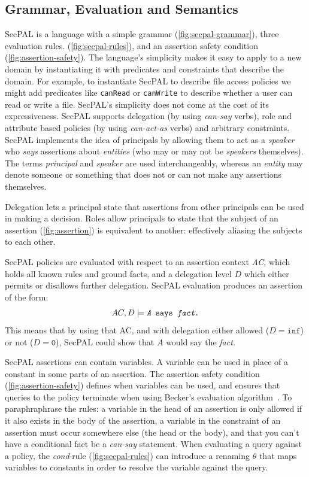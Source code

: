\documentclass[thesis.tex]{subfiles}
\begin{document}
\subsection{Grammar, Evaluation and Semantics}
\label{ssec:grammar-evaluation-semantics}

SecPAL is a language with a simple grammar
(\autoref{fig:secpal-grammar}), three evaluation
rules. (\autoref{fig:secpal-rules}), and an assertion safety condition
(\autoref{fig:assertion-safety}). The language's simplicity makes it
easy to apply to a new domain by instantiating it with predicates and
constraints that describe the domain. For example, to instantiate
SecPAL to describe file access policies we might add predicates like
\texttt{canRead} or \texttt{canWrite} to describe whether a user can
read or write a file. SecPAL's simplicity does not come at the cost of
its expressiveness. SecPAL supports delegation (by using
\emph{can-say} verbs), role and attribute based policies (by using
\emph{can-act-as} verbs) and arbitrary constraints.  SecPAL implements
the idea of principals by allowing them to act as a \emph{speaker} who
\emph{says} assertions about \emph{entities} (who may or may not be
\emph{speakers} themselves). The terms \emph{principal} and
\emph{speaker} are used interchangeably, whereas an \emph{entity} may
denote someone or something that does not or can not make any
assertions themselves.

Delegation lets a principal state that assertions from other
principals can be used in making a decision. Roles allow principals to
state that the subject of an assertion (\autoref{fig:assertion}) is
equivalent to another: effectively aliasing the
subjects to each other.

SecPAL policies are evaluated with respect to an assertion context
\emph{AC}, which holds all known rules and ground facts, and a
delegation level $D$ which either permits or disallows further
delegation. SecPAL evaluation produces an assertion of the form:
\begin{equation*}
 AC, D \models \texttt{{\itshape A} says {\itshape fact}.} 
\end{equation*}
This means that by using that AC, and with delegation either
allowed ($D = \mathtt{inf}$) or not ($D = \mathtt{0}$), SecPAL could show that
$A$ would say the \emph{fact.}

SecPAL assertions can contain variables. A variable can be used in
place of a constant in some parts of an assertion.  The assertion
safety condition (\autoref{fig:assertion-safety}) defines when
variables can be used, and ensures that queries to the policy
terminate when using Becker's evaluation
algorithm~\cite{becker_secpal:_2006}.  To paraphraphrase the rules: a
variable in the head of an assertion is only allowed if it also exists
in the body of the assertion, a variable in the constraint of an
assertion must occur somewhere else (the head or the body), and that
you can't have a conditional fact be a \emph{can-say} statement.  When
evaluating a query against a policy, the \emph{cond}-rule
(\autoref{fig:secpal-rules}) can introduce a renaming $\theta$ that
maps variables to constants in order to resolve the variable against
the query.
\end{document}
